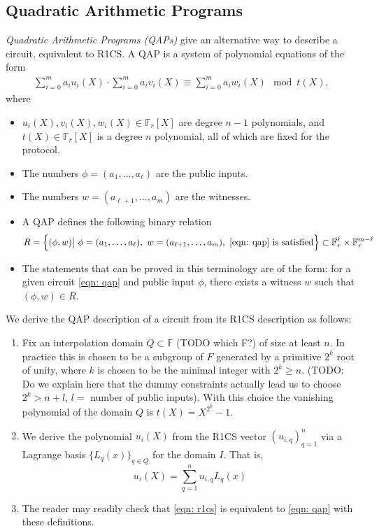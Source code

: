 \subsection{Quadratic Arithmetic Programs}
\emph{Quadratic Arithmetic Programs (QAPs)} give an alternative way to describe a circuit, equivalent to R1CS. A QAP is a system of polynomial equations of the form
\begin{align}
\sum_{i=0}^m a_i u_i(X) \cdot \sum_{i=0}^m a_i v_i(X) \equiv \sum_{i=0}^m a_i w_i(X) \mod t(X), \label{eqn: qap}
\end{align}
where 
\begin{itemize}
\item $u_i(X), v_i(X), w_i(X) \in \mathbb{F}_r[X]$ are degree $n-1$ polynomials, and $t(X) \in \mathbb{F}_r[X]$ is a degree $n$ polynomial, all of which are fixed for the protocol.
\item The numbers $\phi = (a_1, \dots, a_\ell)$ are the public inputs.
\item The numbers $w = (a_{\ell + 1}, \dots, a_m)$ are the witnesses.
\item A QAP defines the following binary relation
\begin{align}
R = \left\{ (\phi, w) \big| \ \phi = (a_1, \dots, a_\ell), \ w = (a_{\ell + 1}, \dots, a_m), \ \eqref{eqn: qap} \textrm{ is satisfied} \right\} \subset \mathbb{F}_r^\ell \times \mathbb{F}_r^{m-\ell}
\end{align}
\item The statements that can be proved in this terminology are of the form: for a given circuit \eqref{eqn: qap} and public input $\phi$, there exists a witness $w$ such that $(\phi, w) \in R$.
\end{itemize}

We derive the QAP description of a circuit from its R1CS description as follows:
\begin{enumerate}
    \item Fix an interpolation domain $Q \subset \mathbb{F}$ (TODO which F?) of size at least $n$. In practice this is chosen to be a subgroup of $F$ generated by a primitive $2^k$ root of unity, where $k$ is chosen to be the minimal integer with $2^k \ge n$. (TODO: Do we explain here that the dummy constraints actually lead us to choose $2^k > n+l$, $l = $ number of public inputs). With this choice the vanishing polynomial of the domain $Q$ is $t(X) = X^{2^k}-1$.
    \item We derive the polynomial $u_i(X)$ from the R1CS vector $(u_{i,q})_{q=1}^n$ via a Lagrange basis $\{ L_q(x) \}_{q \in Q}$ for the domain $I$.  That is,
    \begin{equation}
        u_i(X) = \sum_{q=1}^n u_{i,q} L_q(x) 
    \end{equation}
    \item The reader may readily check that \eqref{eqn: r1cs} is equivalent to \eqref{eqn: qap} with these definitions.
\end{enumerate}

